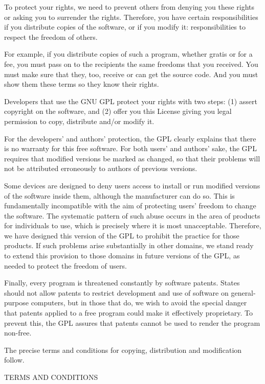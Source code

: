 \documentclass[parskip=half]{scrartcl}
\begin{document}
  To protect your rights, we need to prevent others from denying you
these rights or asking you to surrender the rights.  Therefore, you have
certain responsibilities if you distribute copies of the software, or if
you modify it: responsibilities to respect the freedom of others.

  For example, if you distribute copies of such a program, whether
gratis or for a fee, you must pass on to the recipients the same
freedoms that you received.  You must make sure that they, too, receive
or can get the source code.  And you must show them these terms so they
know their rights.

  Developers that use the GNU GPL protect your rights with two steps:
(1) assert copyright on the software, and (2) offer you this License
giving you legal permission to copy, distribute and/or modify it.

  For the developers' and authors' protection, the GPL clearly explains
that there is no warranty for this free software.  For both users' and
authors' sake, the GPL requires that modified versions be marked as
changed, so that their problems will not be attributed erroneously to
authors of previous versions.

  Some devices are designed to deny users access to install or run
modified versions of the software inside them, although the manufacturer
can do so.  This is fundamentally incompatible with the aim of
protecting users' freedom to change the software.  The systematic
pattern of such abuse occurs in the area of products for individuals to
use, which is precisely where it is most unacceptable.  Therefore, we
have designed this version of the GPL to prohibit the practice for those
products.  If such problems arise substantially in other domains, we
stand ready to extend this provision to those domains in future versions
of the GPL, as needed to protect the freedom of users.

  Finally, every program is threatened constantly by software patents.
States should not allow patents to restrict development and use of
software on general-purpose computers, but in those that do, we wish to
avoid the special danger that patents applied to a free program could
make it effectively proprietary.  To prevent this, the GPL assures that
patents cannot be used to render the program non-free.

  The precise terms and conditions for copying, distribution and
modification follow.

                       TERMS AND CONDITIONS
\end{document}
